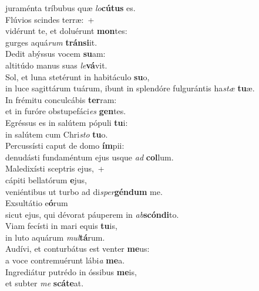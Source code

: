 \evenverse juraménta tríbubus quæ \textit{lo}\textbf{cú}\textbf{tus} es.\\
\oddverse Flúvios scindes terræ:~+\\
\oddverse  vidérunt te, et doluérunt \textbf{mon}tes:~\*\\
\oddverse gurges aquá\textit{rum} \textbf{trán}\textbf{si}it.\\
\evenverse Dedit abýssus vocem \textbf{su}am:~\*\\
\evenverse altitúdo manus suas \textit{le}\textbf{vá}vit.\\
\oddverse Sol, et luna stetérunt in habitáculo \textbf{su}o,~\*\\
\oddverse in luce sagittárum tuárum, ibunt in splendóre fulgurántis ha\textit{stæ} \textbf{tu}æ.\\
\evenverse In frémitu conculcábis \textbf{ter}ram:~\*\\
\evenverse et in furóre obstupefáci\textit{es} \textbf{gen}tes.\\
\oddverse Egréssus es in salútem pópuli \textbf{tu}i:~\*\\
\oddverse in salútem cum Chri\textit{sto} \textbf{tu}o.\\
\evenverse Percussísti caput de domo \textbf{ím}pii:~\*\\
\evenverse denudásti fundaméntum ejus usque \textit{ad} \textbf{col}lum.\\
\oddverse Maledixísti sceptris ejus,~+\\
\oddverse  cápiti bellatórum \textbf{e}jus,~\*\\
\oddverse veniéntibus ut turbo ad di\textit{sper}\textbf{gén}\textbf{dum} me.\\
\evenverse Exsultátio e\textbf{ó}rum~\*\\
\evenverse sicut ejus, qui dévorat páuperem in \textit{ab}\textbf{scón}\textbf{di}to.\\
\oddverse Viam fecísti in mari equis \textbf{tu}is,~\*\\
\oddverse in luto aquárum \textit{mul}\textbf{tá}rum.\\
\evenverse Audívi, et conturbátus est venter \textbf{me}us:~\*\\
\evenverse a voce contremuérunt lábi\textit{a} \textbf{me}a.\\
\oddverse Ingrediátur putrédo in óssibus \textbf{me}is,~\*\\
\oddverse et subter \textit{me} \textbf{scá}\textbf{te}at.\\
